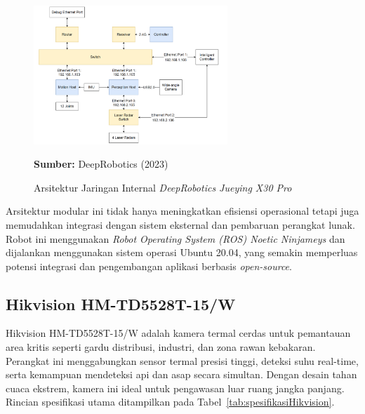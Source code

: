 \begin{figure}[H]
  \centering
  \includegraphics[width=0.65\textwidth]{gambar/bab2/network-x30.png}
  \caption{Arsitektur Jaringan Internal \emph{DeepRobotics Jueying X30 Pro}}
  \label{fig:network_architecture_x30pro}
  \footnotesize{\textbf{Sumber:} DeepRobotics (2023)}
\end{figure}


Arsitektur modular ini tidak hanya meningkatkan efisiensi operasional tetapi juga memudahkan integrasi dengan sistem eksternal dan pembaruan perangkat lunak. Robot ini menggunakan \emph{Robot Operating System (ROS) Noetic Ninjameys} dan dijalankan menggunakan sistem operasi Ubuntu 20.04, yang semakin memperluas potensi integrasi dan pengembangan aplikasi berbasis \emph{open-source}.


\subsection{Hikvision HM-TD5528T-15/W}

Hikvision HM-TD5528T-15/W adalah kamera termal cerdas untuk pemantauan area kritis seperti gardu distribusi, industri, dan zona rawan kebakaran. Perangkat ini menggabungkan sensor termal presisi tinggi, deteksi suhu real-time, serta kemampuan mendeteksi api dan asap secara simultan. Dengan desain tahan cuaca ekstrem, kamera ini ideal untuk pengawasan luar ruang jangka panjang. Rincian spesifikasi utama ditampilkan pada Tabel~\ref{tab:spesifikasiHikvision}.

